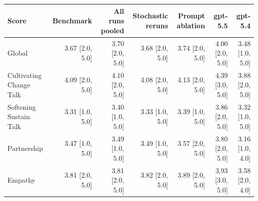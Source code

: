 \begin{tabular}{lrrrrrr}
\toprule
Score & Benchmark & All runs pooled & Stochastic reruns & Prompt ablation & gpt-5.5 & gpt-5.4 \\
\midrule
Global & 3.67 [2.0, 5.0] & 3.70 [2.0, 5.0] & 3.68 [2.0, 5.0] & 3.74 [2.0, 5.0] & 4.00 [2.0, 5.0] & 3.48 [1.0, 5.0] \\
Cultivating Change Talk & 4.09 [2.0, 5.0] & 4.10 [2.0, 5.0] & 4.08 [2.0, 5.0] & 4.13 [2.0, 5.0] & 4.39 [3.0, 5.0] & 3.88 [2.0, 5.0] \\
Softening Sustain Talk & 3.31 [1.0, 5.0] & 3.40 [1.0, 5.0] & 3.33 [1.0, 5.0] & 3.39 [1.0, 5.0] & 3.86 [2.0, 5.0] & 3.32 [1.0, 5.0] \\
Partnership & 3.47 [1.0, 5.0] & 3.49 [1.0, 5.0] & 3.49 [1.0, 5.0] & 3.57 [2.0, 5.0] & 3.80 [2.0, 5.0] & 3.16 [1.0, 4.0] \\
Empathy & 3.81 [2.0, 5.0] & 3.81 [2.0, 5.0] & 3.82 [2.0, 5.0] & 3.89 [2.0, 5.0] & 3.93 [3.0, 5.0] & 3.58 [2.0, 4.0] \\
\bottomrule
\end{tabular}